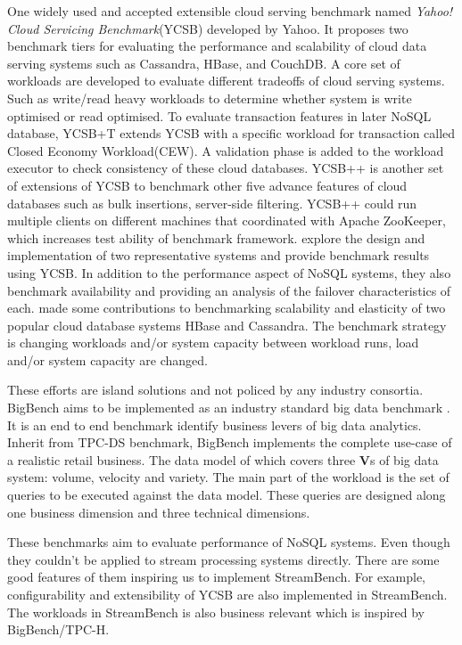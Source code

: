 One widely used and accepted extensible cloud serving benchmark named \textit{Yahoo! Cloud Servicing Benchmark}(YCSB) developed by Yahoo\cite{YCSB}. It  proposes two benchmark tiers for evaluating the performance and scalability of cloud data serving systems such as Cassandra, HBase, and CouchDB. A core set of workloads are developed to evaluate different tradeoffs of cloud serving systems. Such as write/read heavy workloads to determine whether system is write optimised or read optimised. To evaluate transaction features in later NoSQL database,  YCSB+T \cite{dey2014ycsb+t} extends YCSB with a specific workload for transaction called Closed Economy Workload(CEW). A validation phase is added to the workload executor to check consistency of these cloud databases. YCSB++ \cite{ycsb++} is another set of extensions of YCSB to benchmark other five advance features of cloud databases such as bulk insertions, server-side filtering. YCSB++ could run multiple clients on different machines that coordinated with Apache ZooKeeper, which increases test ability of benchmark framework. \citet{pokludabenchmarking}  explore the design and implementation of two representative systems and provide benchmark results using YCSB. In addition to the performance aspect of NoSQL systems, they also benchmark availability and providing an analysis of the failover characteristics of each. \citet{Kuhlenkamp} made some contributions to benchmarking scalability and elasticity of two popular cloud database systems HBase and Cassandra. The benchmark strategy is changing workloads and/or system capacity between workload runs, load and/or system capacity are changed.

These efforts are island solutions and not policed by any industry consortia. BigBench aims to be implemented as an industry standard big data benchmark \cite{BigBench}. It is an end to end benchmark identify business levers of big data analytics. Inherit from TPC-DS benchmark, BigBench implements the complete use-case of a realistic retail business. The data model of which covers three \textbf{V}s of big data system: volume, velocity and variety. The main part of the workload is the set of queries to be executed against the data model. These queries are designed along one business dimension and three technical dimensions\cite{BigBench}.

These benchmarks aim to evaluate performance of NoSQL systems. Even though they couldn't be applied to stream processing systems directly. There are some good features of them inspiring us to implement StreamBench. For example, configurability and extensibility of YCSB are also implemented in StreamBench. The workloads in StreamBench is also business relevant which is inspired by BigBench/TPC-H.
